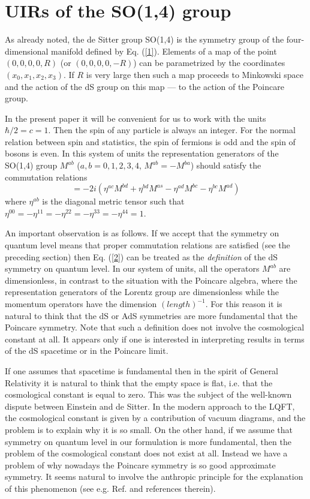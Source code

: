 \documentclass[a4paper,12pt]{article}%
\begin{document}
\section{UIRs of the SO(1,4) group}
\label{S2}

As already noted, the de Sitter group SO(1,4) is the symmetry 
group of the four-dimensional manifold defined by Eq. (\ref{1}).
Elements of a map of the point $(0,0,0,0,R)$ (or $(0,0,0,0,-R)$) 
can be parametrized by the
coordinates $(x_0,x_1,x_2,x_3)$. If $R$ is very large then such a
map  proceeds to Minkowski space and the action of the dS group 
on this map --- to  the action of the Poincare group.

\begin{sloppypar}
In the present paper it will be convenient for us to work with 
the units $\hbar/2=c=1$. Then the spin of any particle is
always an integer. For the normal relation between spin and 
statistics, the spin of fermions is odd and the spin of bosons
is even. In this system of units the representation generators 
of the SO(1,4) group
$M^{ab}$ ($a,b=0,1,2,3,4$, $M^{ab}=-M^{ba}$) should satisfy the
commutation relations
\begin{equation}
[M^{ab},M^{cd}]=-2i (\eta^{ac}M^{bd}+\eta^{bd}M^{as}-
\eta^{ad}M^{bc}-\eta^{bc}M^{ad})
\label{2}
\end{equation}
where $\eta^{ab}$ is the diagonal metric tensor such that
$\eta^{00}=-\eta^{11}=-\eta^{22}=-\eta^{33}=-\eta^{44}=1$.
\end{sloppypar}

An important observation is as follows. If we accept that the
symmetry on quantum level means that proper commutation relations
are satisfied (see the preceding section) then Eq. (\ref{2})
can be treated as the {\it definition} of the dS symmetry on quantum
level. In our system of units, all the operators $M^{ab}$ are 
dimensionless, in contrast to the situation with the Poincare
algebra, where the representation generators of the Lorentz
group are dimensionless while the momentum operators have the
dimension $(length)^{-1}$. For this reason it is natural to
think that the dS or AdS symmetries are more fundamental that
the Poincare symmetry. Note that such a definition does not
involve the cosmological constant at all. It appears only if 
one is interested in interpreting results in terms of
the dS spacetime or in the Poincare limit.

If one assumes that spacetime is fundamental then in the 
spirit of General Relativity it is natural to think that 
the empty space is flat, i.e. that the cosmological 
constant is equal to zero. This was the subject of the 
well-known dispute between Einstein and de Sitter. In the 
modern approach to the LQFT, the cosmological constant 
is given by a contribution of vacuum diagrams, 
and the problem is to explain why it is so small. On the 
other hand, if we assume that symmetry on quantum level in 
our formulation is more fundamental, then the problem of 
the cosmological constant does not exist at all. Instead we 
have a problem of why nowadays the Poincare symmetry is so 
good approximate symmetry. It seems natural to 
involve the anthropic principle for the explanation of 
this phenomenon (see e.g. Ref. \cite{Linde} and references 
therein).
\end{document}
